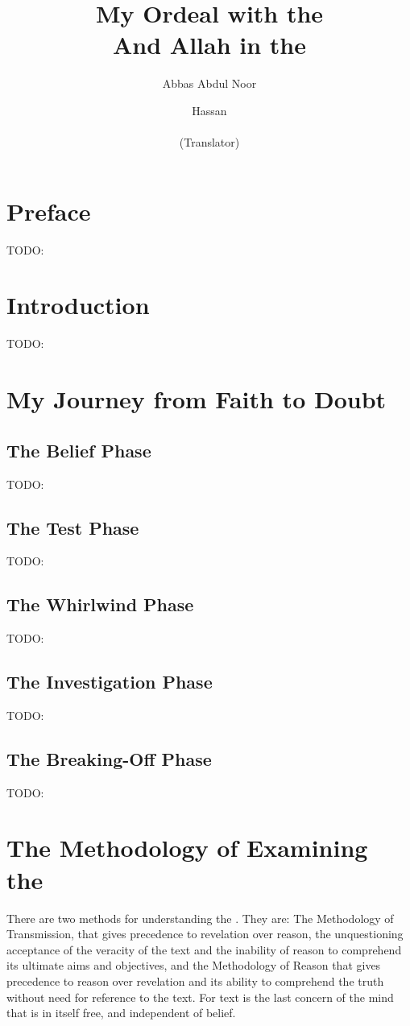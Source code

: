 \documentclass[12pt]{memoir}
\title{My Ordeal with the \Quran\\{\Large And Allah in the \Quran}
\vskip 0.5cm
\ar{\Large \arabictitle}}
\author{Abbas Abdul Noor\\\ar{\abbasAr} \and
Hassan\\\ar{\hassanAr}\\{\small(Translator)}}
\begin{document}
\frontmatter

\maketitle
\thispagestyle{empty}
\cleardoublepage

\setcounter{page}{1}
\tableofcontents

\chapter{Preface}
TODO:

\chapter{Introduction}
TODO:

\mainmatter


\chapter{My Journey from Faith to Doubt}

\section{The Belief Phase}
TODO:
\section{The Test Phase}
TODO:
\section{The Whirlwind Phase}
TODO:
\section{The Investigation Phase}
TODO:
\section{The Breaking-Off Phase}
TODO:

\chapter{The Methodology of Examining the \Quran}

There are two methods for understanding the \Quran.
They are: The Methodology of
Transmission, that gives precedence to revelation over reason, the
unquestioning acceptance of the veracity of the text and the inability of
reason to comprehend its ultimate aims and objectives, and the Methodology of
Reason that gives precedence to reason over revelation and its ability to
comprehend the truth without need for reference to the text.
For text is the last concern of the mind that is in itself free,
and independent of belief.
\end{document}
